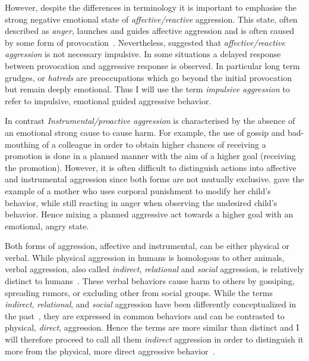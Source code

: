 However, despite the differences in terminology it is important to emphasise the strong negative emotional state of \textit{affective/reactive} aggression.
This state, often described as \textit{anger}, launches and guides affective aggression  and is often caused by some form of provocation~\cite{Geen2001}.
Nevertheless, \citet{Frijda1994} suggested that \textit{affective/reactive aggression} is not necessary impulsive.
In some situations a delayed response between provocation and aggressive response is observed. 
In particular long term grudges, or \textit{hatreds} are preoccupations which go beyond the initial provocation but remain deeply emotional.
Thus I will use the term \textit{impulsive aggression} to refer to impulsive, emotional guided aggressive behavior.

In contrast \textit{Instrumental/proactive aggression} is characterised by the absence of an emotional strong cause to cause harm.
For example, the use of gossip and bad-mouthing of a colleague in order to obtain higher chances of receiving a promotion is done in a planned manner with the aim of a higher goal (receiving the promotion).
However, it is often difficult to distinguish actions into affective and instrumental aggression since both forms are not mutually exclusive.
\citet{Geen2001} gave the example of a mother who uses corporal punishment to modify her child's behavior, while still reacting in anger when observing the undesired child's behavior.
Hence mixing a planned aggressive act towards a higher goal with an emotional, angry state.

Both forms of aggression, affective and instrumental, can be either physical or verbal.
While physical aggression in humans is homologous to other animals, verbal aggression, also called \textit{indirect}, \textit{relational} and \textit{social} aggression, is relatively distinct to humans~\cite{Archer2005}.
These verbal behaviors cause harm to others by gossiping, spreading rumors, or excluding other from social groups.
While the terms \textit{indirect}, \textit{relational}, and \textit{social} aggression have been differently conceptualized in the past~\cite{Archer2001}, they are expressed in common behaviors and can be contrasted to physical, \textit{direct}, aggression.
Hence the terms are more similar than distinct and I will therefore proceed to call all them \textit{indirect} aggression in order to distinguish it more from the physical, more direct aggressive behavior~\cite{Archer2005}.

